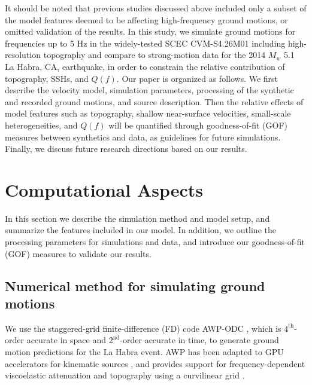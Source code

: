 It should be noted that previous studies discussed above included only a subset of the model features deemed to be affecting high-frequency ground motions, or omitted validation of the results. In this study, we simulate ground motions for frequencies up to 5 Hz in the widely-tested SCEC CVM-S4.26M01 including high-resolution topography and compare to strong-motion data for the 2014 $M_w$ 5.1 La Habra, CA, earthquake, in order to constrain the relative contribution of topography, SSHs, and $Q(f)$. Our paper is organized as follows. We first describe the velocity model, simulation parameters, processing of the synthetic and recorded ground motions, and source description. Then the relative effects of model features such as topography, shallow near-surface velocities, small-scale heterogeneities, and $Q(f)$ will be quantified through goodness-of-fit (GOF) measures between synthetics and data, as guidelines for future simulations. Finally, we discuss future research directions based on our results.



\section{Computational Aspects}\label{approach}

In this section we describe the simulation method and model setup, and summarize the features included in our model. In addition, we outline the processing parameters for simulations and data, and introduce our goodness-of-fit (GOF) measures to validate our results.

\subsection{Numerical method for simulating ground motions}
We use the staggered-grid finite-difference (FD) code AWP-ODC \citep[Anelastic Wave Propagation, Olsen-Day-Cui, from the authors of the code, hereafter denoted by AWP;][]{cuiScalableEarthquakeSimulation2010}, which is $4^{\text{th}}$-order accurate in space and $2^{\text{nd}}$-order accurate in time, to generate ground motion predictions for the La Habra event. AWP has been adapted to GPU accelerators for kinematic sources \citep{cui2013physics}, and provides support for frequency-dependent viscoelastic attenuation \citep{withersMemoryEfficientSimulation2015} and topography using a curvilinear grid \citep{oreillyHighorderFiniteDifference2021}. %

